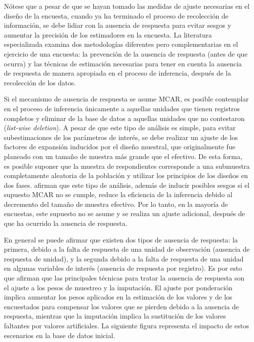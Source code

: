 \documentclass[
  12pt,
  spanish,
]{book}
\begin{document}
Nótese que a pesar de que se hayan tomado las medidas de ajuste necesarias en el diseño de la encuesta, cuando ya ha terminado el proceso de recolección de información, se debe lidiar con la ausencia de respuesta para evitar sesgos y aumentar la precisión de los estimadores en la encuesta. La literatura especializada examina dos metodologías diferentes pero complementarias en el ejercicio de una encuesta: la prevención de la ausencia de respuesta (antes de que ocurra) y las técnicas de estimación necesarias para tener en cuenta la ausencia de respuesta de manera apropiada en el proceso de inferencia, después de la recolección de los datos.

Si el mecanismo de ausencia de respuesta se asume MCAR, es posible contemplar en el proceso de inferencia únicamente a aquellas unidades que tienen registros completos y eliminar de la base de datos a aquellas unidades que no contestaron (\emph{list-wise deletion}). A pesar de que este tipo de análisis es simple, para evitar subestimaciones de los parámetros de interés, se debe realizar un ajuste de los factores de expansión inducidos por el diseño muestral, que originalmente fue planeado con un tamaño de muestra más grande que el efectivo. De esta forma, es posible suponer que la muestra de respondientes corresponde a una submuestra completamente aleatoria de la población y utilizar los principios de los diseños en dos fases. \citet[capítulo 11]{Heeringa_West_Berglund_2010} afirman que este tipo de análisis, además de inducir posibles sesgos si el supuesto MCAR no se cumple, reduce la eficiencia de la inferencia debido al decremento del tamaño de muestra efectivo. Por lo tanto, en la mayoría de encuestas, este supuesto no se asume y se realiza un ajuste adicional, después de que ha ocurrido la ausencia de respuesta.

En general se puede afirmar que existen dos tipos de ausencia de respuesta: la primera, debido a la falta de respuesta de una unidad de observación (ausencia de respuesta de unidad), y la segunda debido a la falta de respuesta de una unidad en algunas variables de interés (ausencia de respuesta por registro). Es por esto que \citet[sección 15.5]{Sarndal_Swensson_Wretman_2003} afirman que las principales técnicas para tratar la ausencia de respuesta son el ajuste a los pesos de muestreo y la imputación. El ajuste por ponderación implica aumentar los pesos aplicados en la estimación de los valores y de los encuestados para compensar los valores que se pierden debido a la ausencia de respuesta, mientras que la imputación implica la sustitución de los valores faltantes por valores artificiales. La siguiente figura representa el impacto de estos escenarios en la base de datos inicial.
\end{document}
